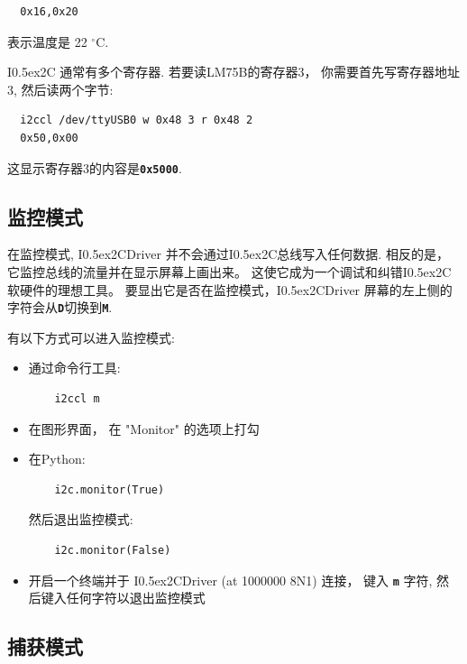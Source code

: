\documentclass{article}
\newcommand{\two}{\raise0.5ex\hbox{\footnotesize{2}}}
\newcommand{\iic}{I\two{}C}
\newcommand{\iicdriver}{I\two{}CDriver}
\newcommand{\degc}{$^{\circ}$C}
\newcommand{\mach}[1]{\texttt{\textbf{#1}}}
\begin{document}
\begin{lstlisting}
  0x16,0x20
\end{lstlisting}

表示温度是 22 \degc.

\iic{} 通常有多个寄存器. 
若要读LM75B的寄存器3， 你需要首先写寄存器地址3, 然后读两个字节:
\begin{lstlisting}
  i2ccl /dev/ttyUSB0 w 0x48 3 r 0x48 2
  0x50,0x00
\end{lstlisting}

这显示寄存器3的内容是\mach{0x5000}.

\subsection{监控模式}

在监控模式, \iicdriver{}  并不会通过\iic{}总线写入任何数据.
相反的是， 它监控总线的流量并在显示屏幕上画出来。 
这使它成为一个调试和纠错\iic{}软硬件的理想工具。
要显出它是否在监控模式，\iicdriver{}  屏幕的左上侧的字符会从\mach{D}切换到\mach{M}.


有以下方式可以进入监控模式:


\begin{itemize}
\item 通过命令行工具:

\begin{lstlisting}
    i2ccl m
\end{lstlisting}

\item 在图形界面， 在 "Monitor" 的选项上打勾
\item 在Python:

\begin{lstlisting}
    i2c.monitor(True)
\end{lstlisting}
  
然后退出监控模式:

\begin{lstlisting}
    i2c.monitor(False)
\end{lstlisting}

\item 开启一个终端并于 \iicdriver{} (at 1000000 8N1) 连接， 键入 \mach{m} 字符,  然后键入任何字符以退出监控模式
\end{itemize}

\subsection{捕获模式}
\end{document}
